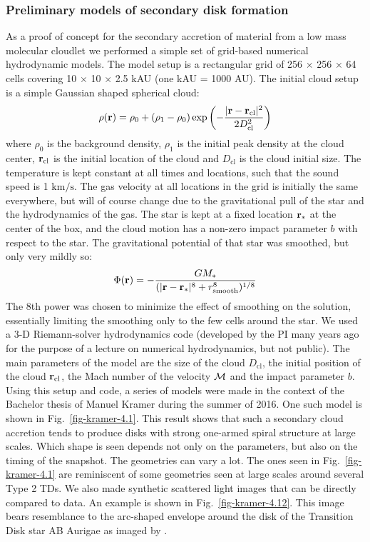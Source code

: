 \documentclass[10pt,fleqn,twoside]{article}
\begin{document}
\subsubsection{Preliminary models of secondary disk formation}
As a proof of concept for the secondary accretion of material from a low
mass molecular cloudlet we performed a simple set of grid-based numerical
hydrodynamic models. The model setup is a rectangular grid of 256 $\times$
256 $\times$ 64 cells covering 10 $\times$ 10 $\times$ 2.5 kAU (one kAU =
1000 AU). The initial cloud setup is a simple Gaussian shaped spherical
cloud:
\begin{equation}
\rho({\bf r}) = \rho_0 + (\rho_1-\rho_0)\exp\left(-\frac{|{\bf r}-{\bf r}_{\mathrm{cl}}|^2}{2D^2_{\mathrm{cl}}}\right)
\end{equation}
where $\rho_0$ is the background density, $\rho_1$ is the initial peak
density at the cloud center, ${\bf r}_{\mathrm{cl}}$ is the initial location
of the cloud and $D_{\mathrm{cl}}$ is the cloud initial size. The
temperature is kept constant at all times and locations, such that the sound
speed is 1 $\mathrm{km}/\mathrm{s}$. The gas velocity at all locations in
the grid is initially the same everywhere, but will of course change due to
the gravitational pull of the star and the hydrodynamics of the gas. The
star is kept at a fixed location ${\bf r}_{*}$ at the center of the box, and
the cloud motion has a non-zero impact parameter $b$ with respect to the
star. The gravitational potential of that star was smoothed, but only very
mildly so:
\begin{equation}
  \Phi({\bf r}) = -\frac{GM_{*}}{(|{\bf r}-{\bf r}_{*}|^8+r_{\mathrm{smooth}}^8)^{1/8}}
\end{equation}
The 8th power was chosen to minimize the effect of smoothing on the
solution, essentially limiting the smoothing only to the few cells around
the star. We used a 3-D Riemann-solver hydrodynamics code (developed by the
PI many years ago for the purpose of a lecture on numerical hydrodynamics,
but not public). The main parameters of the model are the size of the cloud
$D_{\mathrm{cl}}$, the initial position of the cloud ${\bf
  r}_{\mathrm{cl}}$, the Mach number of the velocity ${\cal M}$ and the
impact parameter $b$. Using this setup and code, a series of models were
made in the context of the Bachelor thesis of Manuel Kramer during the
summer of 2016. One such model is shown in Fig.~\ref{fig-kramer-4.1}.  This
result shows that such a secondary cloud accretion tends to produce disks
with strong one-armed spiral structure at large scales. Which shape is seen
depends not only on the parameters, but also on the timing of the snapshot.
The geometries can vary a lot. The ones seen in Fig.~\ref{fig-kramer-4.1}
are reminiscent of some geometries seen at large scales around several Type
2 TDs. We also made synthetic scattered light images that can be directly
compared to data. An example is shown in Fig.~\ref{fig-kramer-4.12}. This
image bears resemblance to the arc-shaped envelope around the disk of the
Transition Disk star AB Aurigae as imaged by \citet{1999ApJ...523L.151G}.
\end{document}
